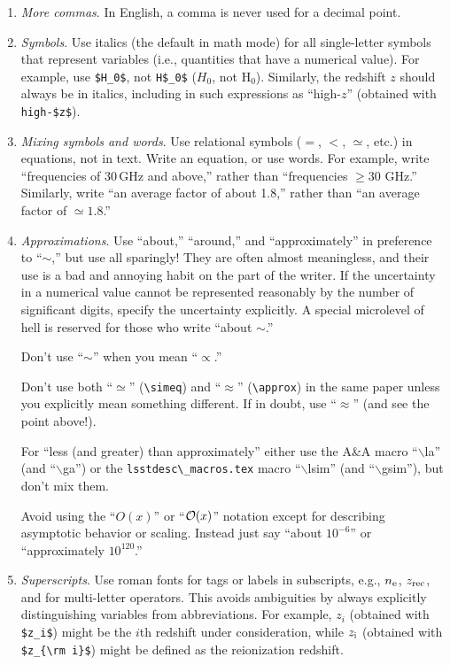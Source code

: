 \documentclass[letterpaper,11pt]{article}
\begin{document}
\begin{enumerate}
\item {\it More commas\/}. In English, a comma is never used for a decimal
point. 

\item {\it Symbols\/}. Use italics (the default in math mode)  for all
single-letter symbols that represent variables (i.e., quantities that have a
numerical value).  For example, use {\tt \$H\_0\$}, not {\tt H\$\_0\$}
($H_0$, not H$_0$).  Similarly, the redshift $z$ should always be in italics,
including in such expressions as ``high-$z$'' (obtained with \verb|high-$z$|).  

\item {\it Mixing symbols and words\/}.   Use relational symbols ($=$,  $<$, $\simeq$, etc.) in equations, not in
text.   Write an equation, or use words.  For example, write ``frequencies of
30\,GHz and above,'' rather than ``frequencies $\ge 30$ GHz.''  Similarly,
write ``an average factor of about 1.8,'' rather than ``an average factor of
$\simeq 1.8$.''  

\item {\it Approximations\/}.
Use ``about,'' ``around,'' and ``approximately'' in preference to
``$\sim$,'' but use all sparingly!  They are often almost meaningless, and
their use is a bad and annoying habit on the part of the writer.  If the
uncertainty in a numerical value cannot be represented reasonably by the
number of significant digits, specify the uncertainty explicitly.  A special
microlevel of hell is reserved for those who write ``about $\sim$.''

Don't use ``$\sim$''  when you mean ``$\propto$.''

Don't use both ``$\simeq$'' (\verb|\simeq|) and ``$\approx$'' (\verb|\approx|) in
the same paper unless you explicitly mean something different.  If in doubt,
use ``$\approx$'' (and see the point above!).

For ``less (and greater) than approximately'' either use the A\&A macro
``$\backslash$la'' (and ``$\backslash$ga'') or the \verb|lsstdesc\_macros.tex| macro
``$\backslash$lsim'' (and ``$\backslash$gsim''), but don't mix them.

Avoid using the ``$O(x)$'' or ``${\cal O}(x)$'' notation except for describing
asymptotic behavior or scaling.  Instead just say ``about $10^{-6}$'' or
``approximately $10^{120}$.''

\item {\it Superscripts\/}.
Use roman fonts for tags or labels in subscripts, e.g., $n_{\rm e}$,
$z_{\rm rec}$, and for multi-letter operators.  This avoids ambiguities by
always explicitly distinguishing variables from abbreviations.  For example,
$z_i$ (obtained with \verb|$z_i$|) might be the $i$th redshift under consideration,
while $z_{\rm i}$ (obtained with \verb|$z_{\rm i}$|) might be defined as the
reionization redshift.


\end{enumerate}
\end{document}
